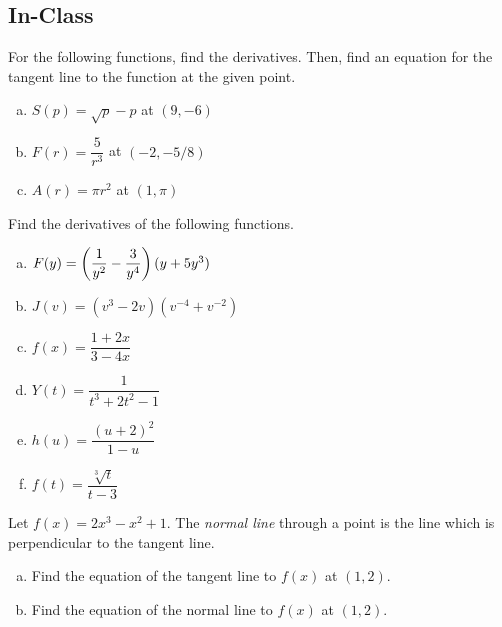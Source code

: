 \documentclass[notes]{subfiles}
\begin{document}
	\subsection*{In-Class}
		\begin{ex}
			For the following functions, find the derivatives.  Then, find an equation for the tangent line to the function at the given point.
			\begin{enumerate}[(a)]
				\item $S(p) = \sqrt{p}-p$ at $(9,-6)$
					
			 	\item $F(r) = \dfrac{5}{r^3}$ at $(-2,-5/8)$
			 		
				\item $A(r) = \pi r^2$ at $(1,\pi)$
			\end{enumerate}
		\end{ex}
		\begin{ex}
			Find the derivatives of the following functions.
			\begin{enumerate}[(a)]
				\item $F(y) = \left( \dfrac{1}{y^2}-\dfrac{3}{y^4}\right)(y+5y^3)$ 
					\vs{1}
					\newpage
					
				\item $J(v) = (v^3-2v)(v^{-4}+v^{-2})$ 
					\vs{1}
					
				\item $f(x) = \dfrac{1+2x}{3-4x}$ 
					\vs{1}
					
				\item $Y(t)=\dfrac{1}{t^3+2t^2-1}$ 
					\vs{1}
					
		 		\item $h(u) = \dfrac{(u+2)^2}{1-u}$ 
		 			\vs{1}
		 			\newpage
		 			
				\item $f(t) = \dfrac{\sqrt[3]{t}}{t-3}$ 
					\vs{1}
					
			\end{enumerate}
		\end{ex}
		
		\begin{ex}
			Let $f(x) = 2x^3-x^2+1$.  The \emph{normal line} through a point is the line which is perpendicular to the tangent line.
			\begin{enumerate}[(a)]
				\item Find the equation of the tangent line to $f(x)$ at $(1,2)$.
					
				\item Find the equation of the normal line to $f(x)$ at $(1,2)$.
			\end{enumerate}
		\end{ex}
			
\end{document}

